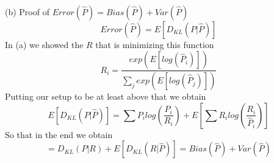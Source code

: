 \documentclass[]{article}
\begin{document}
\paragraph{}
(b) Proof of $Error(\hat{P}) = Bias(\hat{P}) + Var(\hat{P})$
	\begin{displaymath}
	Error(\hat{P}) = E[D_{KL}(P|\hat{P})]
	\end{displaymath}
	In (a) we showed the $R$ that is minimizing this function
	\begin{displaymath}
	R_i = \frac{exp(E[log(\hat{P}_i)])}{\sum_j exp(E[log(\hat{P}_j)])}
	\end{displaymath}
	Putting our setup to be at least above that we obtain
	\begin{displaymath}
	E[D_{KL}(P|\hat{P})] = \sum P_i log(\frac{P_i}{R_i}) + E[\sum R_i log(\frac{R_i}{\hat{P}_i})]
	\end{displaymath}
	So that in the end we obtain
	\begin{displaymath}
	 = D_{KL}(P|R) + E[D_{KL}(R|\hat{P})] = Bias(\hat{P}) + Var(\hat{P})
	\end{displaymath}
\paragraph{}
\end{document}
